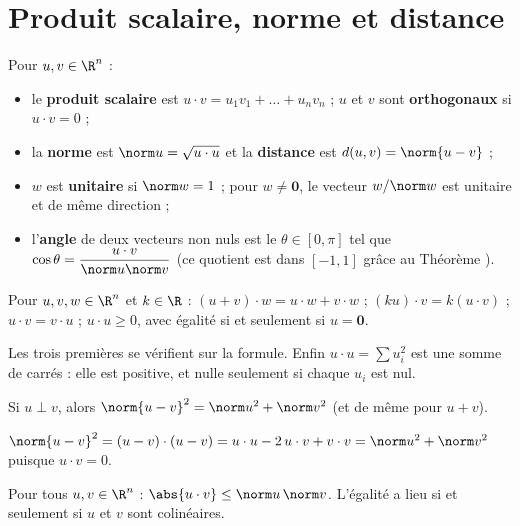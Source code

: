 \section{Produit scalaire, norme et distance}
\begin{definition}
Pour $u,v\in\R^n$ :
\begin{itemize}
\item le \textbf{produit scalaire} est $u\cdot v=u_1v_1+\dots+u_nv_n$ ; $u$ et $v$ sont \textbf{orthogonaux} si $u\cdot v=0$ ;
\item la \textbf{norme} est $\norm u=\sqrt{u\cdot u}$ et la \textbf{distance} est $d(u,v)=\norm{u-v}$ ;
\item $w$ est \textbf{unitaire} si $\norm w=1$ ; pour $w\neq\mathbf 0$, le vecteur $w/\norm w$ est unitaire et de même direction ;
\item l'\textbf{angle} de deux vecteurs non nuls est le $\theta\in[0,\pi]$ tel que $\cos\theta=\dfrac{u\cdot v}{\norm u\norm v}$ (ce quotient est dans $[-1,1]$ grâce au Théorème ).
\end{itemize}
\end{definition}
\begin{proposition}\label{prop-ps}
Pour $u,v,w\in\R^n$ et $k\in\R$ : $(u+v)\cdot w=u\cdot w+v\cdot w$ ; $(ku)\cdot v=k(u\cdot v)$ ; $u\cdot v=v\cdot u$ ; $u\cdot u\ge0$, avec égalité si et seulement si $u=\mathbf 0$.
\end{proposition}
\begin{preuve}
Les trois premières se vérifient sur la formule. Enfin $u\cdot u=\sum u_i^2$ est une somme de carrés : elle est positive, et nulle seulement si chaque $u_i$ est nul.
\end{preuve}
\begin{proposition}[Pythagore]
Si $u\perp v$, alors $\norm{u-v}^2=\norm u^2+\norm v^2$ (et de même pour $u+v$).
\end{proposition}
\begin{preuve}
$\norm{u-v}^2=(u-v)\cdot(u-v)=u\cdot u-2\,u\cdot v+v\cdot v=\norm u^2+\norm v^2$ puisque $u\cdot v=0$.
\end{preuve}
\begin{theoreme}\label{thm-cs}
Pour tous $u,v\in\R^n$ : $\abs{u\cdot v}\le\norm u\,\norm v$. L'égalité a lieu si et seulement si $u$ et $v$ sont colinéaires.
\end{theoreme}
